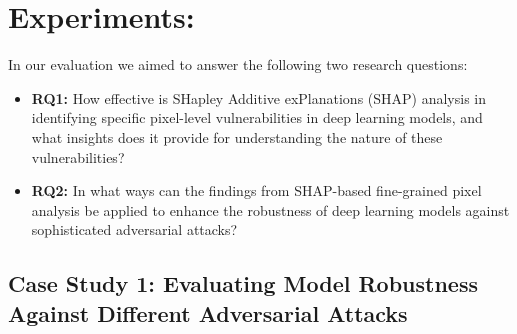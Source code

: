 \documentclass[10pt, conference, a4paper, final]{IEEEtran}
\begin{document}



\section{Experiments:}

In our evaluation we aimed to answer the following two research questions:
\begin{itemize}
    \item\textbf{RQ1:} How effective is SHapley Additive exPlanations (SHAP) analysis in identifying specific pixel-level vulnerabilities in deep learning models, and what insights does it provide for understanding the nature of these vulnerabilities?
    \item\textbf{RQ2:} In what ways can the findings from SHAP-based fine-grained pixel analysis be applied to enhance the robustness of deep learning models against sophisticated adversarial attacks?
\end{itemize}
\subsection{Case Study 1: Evaluating Model Robustness Against Different Adversarial Attacks}
\end{document}
